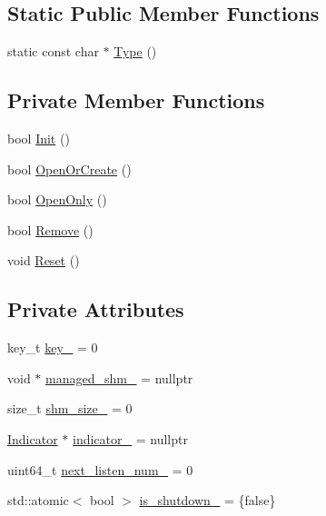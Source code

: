 \subsection*{Static Public Member Functions}
\begin{DoxyCompactItemize}
\item 
static const char $\ast$ \hyperlink{classapollo_1_1cyber_1_1transport_1_1ConditionNotifier_a176c1ca8f3cbc3c15ff2fba4eb0280e2}{Type} ()
\end{DoxyCompactItemize}
\subsection*{Private Member Functions}
\begin{DoxyCompactItemize}
\item 
bool \hyperlink{classapollo_1_1cyber_1_1transport_1_1ConditionNotifier_a822ee78c2f903e366f3c58cc9a9eafa1}{Init} ()
\item 
bool \hyperlink{classapollo_1_1cyber_1_1transport_1_1ConditionNotifier_a506f0777ddba9729af366d6df37b40ad}{Open\-Or\-Create} ()
\item 
bool \hyperlink{classapollo_1_1cyber_1_1transport_1_1ConditionNotifier_afaf6b12a6030861f6ad009b6cfd42f27}{Open\-Only} ()
\item 
bool \hyperlink{classapollo_1_1cyber_1_1transport_1_1ConditionNotifier_aa72b3769316e25e2d4faee6eac8c30a2}{Remove} ()
\item 
void \hyperlink{classapollo_1_1cyber_1_1transport_1_1ConditionNotifier_a5094406c9605ef19b646208ae6036d77}{Reset} ()
\end{DoxyCompactItemize}
\subsection*{Private Attributes}
\begin{DoxyCompactItemize}
\item 
key\-\_\-t \hyperlink{classapollo_1_1cyber_1_1transport_1_1ConditionNotifier_aa5d9958e7a5c7abc7f04ce84f0385c9a}{key\-\_\-} = 0
\item 
void $\ast$ \hyperlink{classapollo_1_1cyber_1_1transport_1_1ConditionNotifier_a22cba07e5cce1d0a782c51f3bcbb09c8}{managed\-\_\-shm\-\_\-} = nullptr
\item 
size\-\_\-t \hyperlink{classapollo_1_1cyber_1_1transport_1_1ConditionNotifier_a48fcd814d133e570bcaaed0527e72edc}{shm\-\_\-size\-\_\-} = 0
\item 
\hyperlink{structapollo_1_1cyber_1_1transport_1_1ConditionNotifier_1_1Indicator}{Indicator} $\ast$ \hyperlink{classapollo_1_1cyber_1_1transport_1_1ConditionNotifier_ac9867419135c8a5484cc1296a69ee7e0}{indicator\-\_\-} = nullptr
\item 
uint64\-\_\-t \hyperlink{classapollo_1_1cyber_1_1transport_1_1ConditionNotifier_a55460f4f3c02cd6cb0d5e0dcabd7576e}{next\-\_\-listen\-\_\-num\-\_\-} = 0
\item 
std\-::atomic$<$ bool $>$ \hyperlink{classapollo_1_1cyber_1_1transport_1_1ConditionNotifier_af8e320c5121acbb3b50956ac7519fdb8}{is\-\_\-shutdown\-\_\-} = \{false\}
\end{DoxyCompactItemize}


